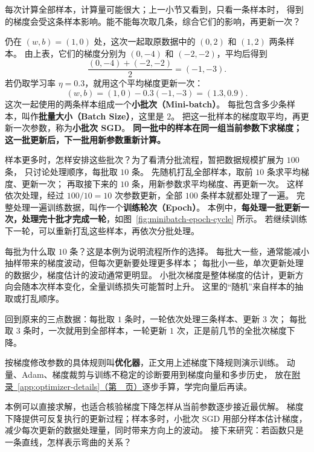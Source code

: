 每次计算全部样本，计算量可能很大；上一小节又看到，只看一条样本时，
得到的梯度会受这条样本影响。能不能每次取几条，综合它们的影响，再更新一次？

仍在 $(w,b)=(1,0)$ 处，这次一起取原数据中的 $(0,2)$ 和 $(1,2)$ 两条样本。
由上表，它们的梯度分别为 $(0,-4)$ 和 $(-2,-2)$，平均后得到
\[
\frac{(0,-4)+(-2,-2)}{2}=(-1,-3).
\]
若仍取学习率 $\eta=0.3$，就用这个平均梯度更新一次：
\[
(w,b)=(1,0)-0.3(-1,-3)=(1.3,0.9).
\]
\label{concept:mini-batch}
这次一起使用的两条样本组成一个\textbf{小批次（Mini-batch）}。
\label{concept:batch-size}
每批包含多少条样本，叫作\textbf{批量大小（Batch Size）}，这里是 $2$。
把这一批样本的梯度取平均，再更新一次参数，称为\textbf{小批次 SGD}。
\textbf{同一批中的样本在同一组当前参数下求梯度；这一批更新后，下一批用新参数重新计算。}

样本更多时，怎样安排这些批次？为了看清分批流程，暂把数据规模扩展为 $100$ 条，
只讨论处理顺序，每批取 $10$ 条。
先随机打乱全部样本，取前 $10$ 条求平均梯度、更新一次；
再取接下来的 $10$ 条，用新参数求平均梯度、再更新一次。
这样依次处理，经过 $100/10=10$ 次参数更新，全部 $100$ 条样本就都处理了一遍。
\label{concept:epoch}
完整处理一遍训练数据，叫作一个\textbf{训练轮次（Epoch）}。
本例中，\textbf{每处理一批更新一次，处理完十批才完成一轮}，如图~\ref{fig:minibatch-epoch-cycle} 所示。
若继续训练下一轮，可以重新打乱这些样本，再依次分批处理。


每批为什么取 $10$ 条？这是本例为说明流程所作的选择。
每批大一些，通常能减小抽样带来的梯度波动，但每次更新要处理更多样本；
每批小一些，单次更新处理的数据少，梯度估计的波动通常更明显。
小批次梯度是整体梯度的估计，更新方向会随本次样本变化，全量训练损失可能暂时上升。
这里的“随机”来自样本的抽取或打乱顺序。

回到原来的三点数据：每批取 $1$ 条时，一轮依次处理三条样本、更新 $3$ 次；
每批取 $3$ 条时，一次就用到全部样本，一轮更新 $1$ 次，正是前几节的全批次梯度下降。

\label{concept:optimizer}
按梯度修改参数的具体规则叫\textbf{优化器}，正文用上述梯度下降规则演示训练。
动量、Adam、梯度裁剪与训练不稳定的诊断要用到梯度向量和多步历史，
放在\hyperref[app:optimizer-details]{附录~\ref*{app:optimizer-details}（第~\pageref*{app:optimizer-details}~页）}逐步手算，学完向量后再读。\par\medskip



\par\smallskip
本例可以直接求解，也适合核验梯度下降怎样从当前参数逐步接近最优解。
梯度下降提供可反复执行的更新过程；样本多时，小批次 SGD 用部分样本估计梯度，
减少每次更新的数据处理量，同时带来方向上的波动。
接下来研究：若函数只是一条直线，怎样表示弯曲的关系？
